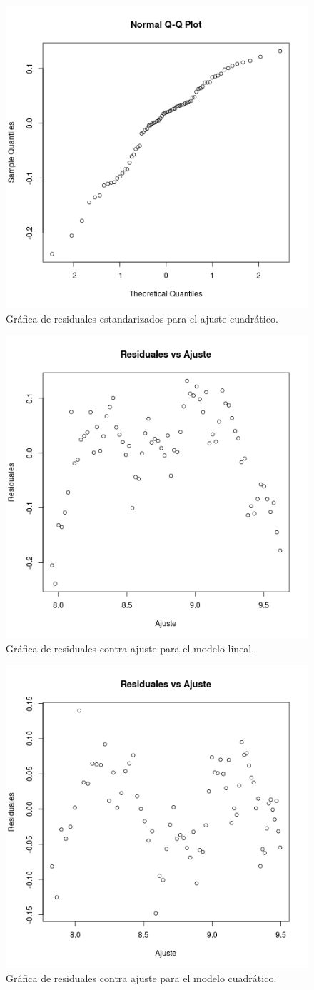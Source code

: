 \documentclass[11pt,letterpaper]{article}
\begin{document}
\begin{itemize}
		\begin{figure}[!h]
			\centering
			\includegraphics[width=0.6\linewidth]{../img/qqnorm_linear.png}
			\caption{Gráfica de residuales estandarizados para el ajuste cuadrático.}
			\label{fig:6}
		\end{figure}
	
		\begin{figure}[!h]
			\centering
			\includegraphics[width=0.6\linewidth]{../img/res_linear.png}
			\caption{Gráfica de residuales contra ajuste para el modelo lineal.}
			\label{fig:7}
		\end{figure}
	
		\begin{figure}[!h]
			\centering
			\includegraphics[width=0.6\linewidth]{../img/res_cuadr.png}
			\caption{Gráfica de residuales contra ajuste para el modelo cuadrático.}
			\label{fig:8}
		\end{figure}
	\end{itemize}
	
\end{document}
